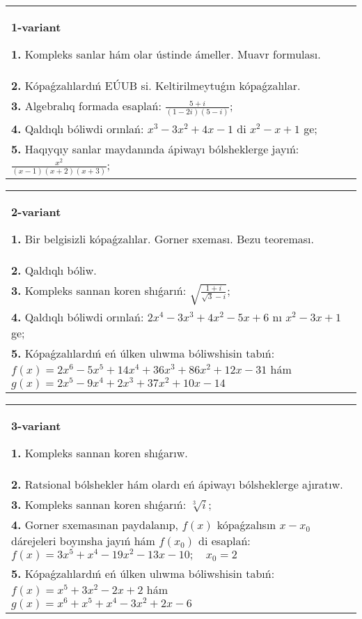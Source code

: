 \documentclass{article}
\begin{document}


\begin{tabular}{m{17cm}}
\textbf{1-variant}
\newline

\textbf{1.} Kompleks sanlar hám olar ústinde ámeller. Muavr formulası.  \\
\textbf{2.} Kópaǵzalılardıń EÚUB si. Keltirilmeytuǵın   kópaǵzalılar. \\
\textbf{3.} Algebralıq formada esaplań: $\frac{5+i}{(1-2 i)(5-i)}$; \\
\textbf{4.} Qaldıqlı bóliwdi orınlań:  $x^3-3 x^2+4 x-1$ di $x^2-x+1$ ge; \\
\textbf{5.} Haqıyqıy sanlar maydanında ápiwayı bólsheklerge jayıń:  $\frac{x^2}{(x-1)(x+2)(x+3)}$; \\

\end{tabular}
\vspace{1cm}


\begin{tabular}{m{17cm}}
\textbf{2-variant}
\newline

\textbf{1.} Bir belgisizli kópaǵzalılar. Gorner sxeması. Bezu teoreması.  \\
\textbf{2.} Qaldıqlı bóliw.  \\
\textbf{3.} Kompleks sannan koren shıǵarıń: $\sqrt{\frac{1+i}{\sqrt{3}-i}}$; \\
\textbf{4.} Qaldıqlı bóliwdi orınlań: $2 x^4-3 x^3+4 x^2-5 x+6$ nı $x^2-3 x+1$ ge; \\
\textbf{5.} Kópaǵzalılardıń eń úlken ulıwma bóliwshisin tabıń:  $f(x)=2 x^6-5 x^5+14 x^4+36 x^3+86 x^2+12 x-31$ hám $g(x)=2 x^5-9 x^4+2 x^3+37 x^2+10 x-14$ \\

\end{tabular}
\vspace{1cm}


\begin{tabular}{m{17cm}}
\textbf{3-variant}
\newline

\textbf{1.} Kompleks sannan koren shıǵarıw. \\
\textbf{2.} Ratsional bólshekler hám olardı eń ápiwayı bólsheklerge ajıratıw. \\
\textbf{3.} Kompleks sannan koren shıǵarıń:  $\sqrt[3]{i}$; \\
\textbf{4.} Gorner sxemasınan paydalanıp, $f(x)$ kópaǵzalısın $x-x_0$ dárejeleri boyınsha jayıń hám $f\left(x_0\right)$ di esaplań: $f(x)=3 x^5+x^4-19 x^2-13 x-10 ; \quad x_0=2$ \\
\textbf{5.} Kópaǵzalılardıń eń úlken ulıwma bóliwshisin tabıń:  $f(x)=x^5+3 x^2-2 x+2$ hám $g(x)=x^6+x^5+x^4-3 x^2+2 x-6$ \\

\end{tabular}
\vspace{1cm}
\end{document}
